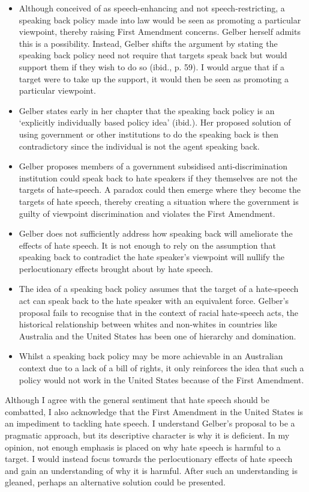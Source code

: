 \documentclass{article}
\begin{document}
\begin{itemize}
    \item Although conceived of as speech-enhancing and not speech-restricting, a speaking back policy made into law would be seen as promoting a particular viewpoint, thereby raising First Amendment concerns. Gelber herself admits this is a possibility. Instead, Gelber shifts the argument by stating the speaking back policy need not require that targets speak back but would support them if they wish to do so (ibid., p. 59). I would argue that if a target were to take up the support, it would then be seen as promoting a particular viewpoint.
    \item Gelber states early in her chapter that the speaking back policy is an ‘explicitly individually based policy idea’ (ibid.). Her proposed solution of using government or other institutions to do the speaking back is then contradictory since the individual is not the agent speaking back.
    \item Gelber proposes members of a government subsidised anti-discrimination institution could speak back to hate speakers if they themselves are not the targets of hate-speech. A paradox could then emerge where they become the targets of hate speech, thereby creating a situation where the government is guilty of viewpoint discrimination and violates the First Amendment.
    \item Gelber does not sufficiently address how speaking back will ameliorate the effects of hate speech. It is not enough to rely on the assumption that speaking back to contradict the hate speaker’s viewpoint will nullify the perlocutionary effects brought about by hate speech.
    \item The idea of a speaking back policy assumes that the target of a hate-speech act can speak back to the hate speaker with an equivalent force. Gelber’s proposal fails to recognise that in the context of racial hate-speech acts, the historical relationship between whites and non-whites in countries like Australia and the United States has been one of hierarchy and domination.
    \item Whilst a speaking back policy may be more achievable in an Australian context due to a lack of a bill of rights, it only reinforces the idea that such a policy would not work in the United States because of the First Amendment.
\end{itemize}

Although I agree with the general sentiment that hate speech should be combatted, I also acknowledge that the First Amendment in the United States is an impediment to tackling hate speech. I understand Gelber’s proposal to be a pragmatic approach, but its descriptive character is why it is deficient. In my opinion, not enough emphasis is placed on why hate speech is harmful to a target. I would instead focus towards the perlocutionary effects of hate speech and gain an understanding of why it is harmful. After such an understanding is gleaned, perhaps an alternative solution could be presented.
\end{document}
